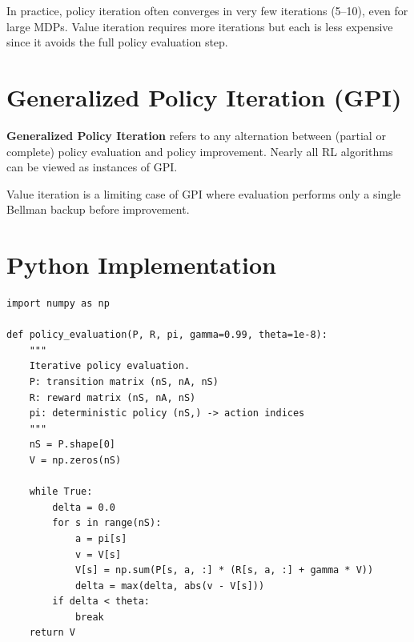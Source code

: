 \begin{remark}
In practice, policy iteration often converges in very few iterations (5--10),
even for large MDPs. Value iteration requires more iterations but each is
less expensive since it avoids the full policy evaluation step.
\end{remark}

\section{Generalized Policy Iteration (GPI)}

\begin{definition}
\textbf{Generalized Policy Iteration} refers to any alternation between
(partial or complete) policy evaluation and policy improvement. Nearly all
RL algorithms can be viewed as instances of GPI.
\end{definition}

\begin{remark}
Value iteration is a limiting case of GPI where evaluation performs only a
single Bellman backup before improvement.
\end{remark}

\section{Python Implementation}

\begin{codeblock}[title=\textbf{Policy Evaluation}]
\begin{verbatim}
import numpy as np

def policy_evaluation(P, R, pi, gamma=0.99, theta=1e-8):
    """
    Iterative policy evaluation.
    P: transition matrix (nS, nA, nS)
    R: reward matrix (nS, nA, nS)
    pi: deterministic policy (nS,) -> action indices
    """
    nS = P.shape[0]
    V = np.zeros(nS)

    while True:
        delta = 0.0
        for s in range(nS):
            a = pi[s]
            v = V[s]
            V[s] = np.sum(P[s, a, :] * (R[s, a, :] + gamma * V))
            delta = max(delta, abs(v - V[s]))
        if delta < theta:
            break
    return V
\end{verbatim}
\end{codeblock}

